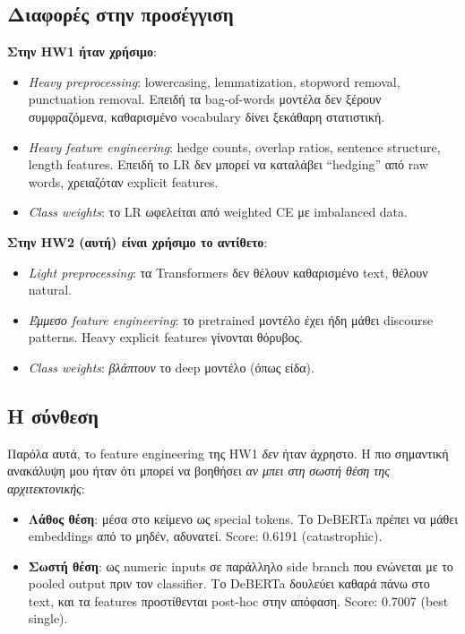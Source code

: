 \documentclass[12pt]{fphw}
\begin{document}
\subsection{Διαφορές στην προσέγγιση}

\textbf{Στην HW1 ήταν χρήσιμο}:
\begin{itemize}
    \item \emph{Heavy preprocessing}: lowercasing, lemmatization, stopword removal, punctuation removal. Επειδή τα bag-of-words μοντέλα δεν ξέρουν συμφραζόμενα, καθαρισμένο vocabulary δίνει ξεκάθαρη στατιστική.
    \item \emph{Heavy feature engineering}: hedge counts, overlap ratios, sentence structure, length features. Επειδή το LR δεν μπορεί να καταλάβει ``hedging'' από raw words, χρειαζόταν explicit features.
    \item \emph{Class weights}: το LR ωφελείται από weighted CE με imbalanced data.
\end{itemize}

\textbf{Στην HW2 (αυτή) είναι χρήσιμο το αντίθετο}:
\begin{itemize}
    \item \emph{Light preprocessing}: τα Transformers δεν θέλουν καθαρισμένο text, θέλουν natural.
    \item \emph{Έμμεσο feature engineering}: το pretrained μοντέλο έχει ήδη μάθει discourse patterns. Heavy explicit features γίνονται θόρυβος.
    \item \emph{Class weights}: \emph{βλάπτουν} το deep μοντέλο (όπως είδα).
\end{itemize}

\subsection{Η σύνθεση}

Παρόλα αυτά, τo feature engineering της HW1 \emph{δεν} ήταν άχρηστο. Η πιο σημαντική ανακάλυψη μου ήταν ότι μπορεί να βοηθήσει \emph{αν μπει στη σωστή θέση της αρχιτεκτονικής}:

\begin{itemize}
    \item \textbf{Λάθος θέση}: μέσα στο κείμενο ως special tokens. Το DeBERTa πρέπει να μάθει embeddings από το μηδέν, αδυνατεί. Score: 0.6191 (catastrophic).
    \item \textbf{Σωστή θέση}: ως numeric inputs σε παράλληλο side branch που ενώνεται με το pooled output πριν τον classifier. Το DeBERTa δουλεύει καθαρά πάνω στο text, και τα features προστίθενται post-hoc στην απόφαση. Score: 0.7007 (best single).
\end{itemize}
\end{document}
